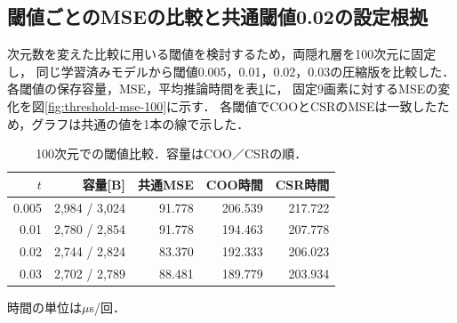 \documentclass[a4paper,11pt]{article}
\begin{document}
\subsection{閾値ごとのMSEの比較と共通閾値0.02の設定根拠}\label{sec:threshold-selection}
次元数を変えた比較に用いる閾値を検討するため，両隠れ層を100次元に固定し，
同じ学習済みモデルから閾値0.005，0.01，0.02，0.03の圧縮版を比較した．
各閾値の保存容量，MSE，平均推論時間を表\ref{tab:threshold}に，
固定9画素に対するMSEの変化を図\ref{fig:threshold-mse-100}に示す．
各閾値でCOOとCSRのMSEは一致したため，グラフは共通の値を1本の線で示した．

\begin{table}[H]
\centering\small
\caption{100次元での閾値比較．容量はCOO／CSRの順．}\label{tab:threshold}
\setlength{\tabcolsep}{5pt}
\begin{tabular}{rrrrr}\toprule
$t$&容量[B]&共通MSE&COO時間&CSR時間\\\midrule
0.005 & 2,984 / 3,024 & 91.778 & 206.539 & 217.722\\\midrule
0.01 & 2,780 / 2,854 & 91.778 & 194.463 & 207.778\\\midrule
0.02 & 2,744 / 2,824 & 83.370 & 192.333 & 206.023\\\midrule
0.03 & 2,702 / 2,789 & 88.481 & 189.779 & 203.934\\\midrule
\bottomrule\end{tabular}\par\smallskip
時間の単位は$\mu$s/回．
\end{table}
\end{document}
